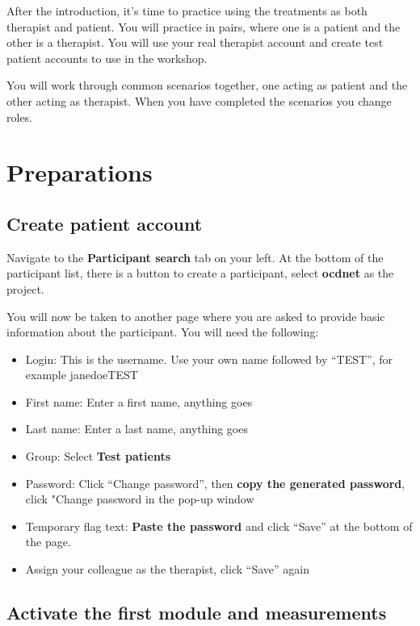 \documentclass[]{book}
\providecommand{\tightlist}{%
  \setlength{\itemsep}{0pt}\setlength{\parskip}{0pt}}
\begin{document}
After the introduction, it's time to practice using the treatments as both therapist and patient. You will practice in pairs, where one is a patient and the other is a therapist. You will use your real therapist account and create test patient accounts to use in the workshop.

You will work through common scenarios together, one acting as patient and the other acting as therapist. When you have completed the scenarios you change roles.

\hypertarget{preparations}{%
\section{Preparations}\label{preparations}}

\hypertarget{create-patient-account}{%
\subsection{Create patient account}\label{create-patient-account}}

Navigate to the \textbf{Participant search} tab on your left. At the bottom of the participant list, there is a button to create a participant, select \textbf{ocdnet} as the project.

You will now be taken to another page where you are asked to provide basic information about the participant. You will need the following:

\begin{itemize}
\tightlist
\item
  Login: This is the username. Use your own name followed by ``TEST'', for example janedoeTEST
\item
  First name: Enter a first name, anything goes
\item
  Last name: Enter a last name, anything goes
\item
  Group: Select \textbf{Test patients}
\item
  Password: Click ``Change password'', then \textbf{copy the generated password}, click "Change password in the pop-up window
\item
  Temporary flag text: \textbf{Paste the password} and click ``Save'' at the bottom of the page.
\item
  Assign your colleague as the therapist, click ``Save'' again
\end{itemize}

\hypertarget{activate-the-first-module-and-measurements}{%
\subsection{Activate the first module and measurements}\label{activate-the-first-module-and-measurements}}
\end{document}
